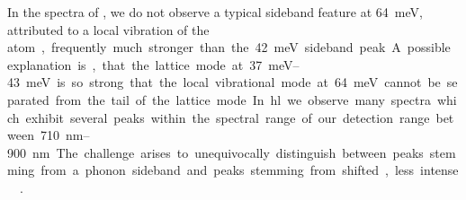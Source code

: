 		In the spectra of \vl, we do not observe a typical \siv sideband feature at \SI{64}{meV}, attributed to a local vibration of the \si atom, frequently much stronger than the  \SI{42}{meV} sideband peak.
		A possible explanation is, that the lattice mode at \SIrange{37}{43}{meV} is so strong that the local vibrational mode at \SI{64}{meV} cannot be separated from the tail of the lattice mode.
		
		In \hl we observe many spectra which exhibit several peaks within the spectral range of our detection range between \SIrange{710}{900}{nm}.
		The challenge arises to unequivocally distinguish between peaks stemming from a phonon sideband and peaks stemming from shifted, less intense \siv \ZPLs.

